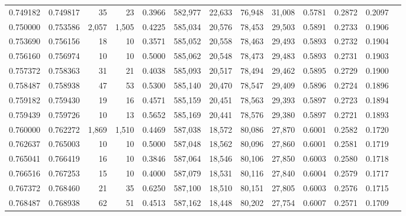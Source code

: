 \begin{tabular}{rrrrrrrrrrrrr}
0.749182 & 0.749817 &     35 &    23 &                                     0.3966 & 582,977 &  22,633 &  76,948 &  31,008 & 0.5781 & 0.2872 & 0.2097 \\
0.750000 & 0.753586 &  2,057 & 1,505 &                                     0.4225 & 585,034 &  20,576 &  78,453 &  29,503 & 0.5891 & 0.2733 & 0.1906 \\
0.753690 & 0.756156 &     18 &    10 &                                     0.3571 & 585,052 &  20,558 &  78,463 &  29,493 & 0.5893 & 0.2732 & 0.1904 \\
0.756160 & 0.756974 &     10 &    10 &                                     0.5000 & 585,062 &  20,548 &  78,473 &  29,483 & 0.5893 & 0.2731 & 0.1903 \\
0.757372 & 0.758363 &     31 &    21 &                                     0.4038 & 585,093 &  20,517 &  78,494 &  29,462 & 0.5895 & 0.2729 & 0.1900 \\
0.758487 & 0.758938 &     47 &    53 &                                     0.5300 & 585,140 &  20,470 &  78,547 &  29,409 & 0.5896 & 0.2724 & 0.1896 \\
0.759182 & 0.759430 &     19 &    16 &                                     0.4571 & 585,159 &  20,451 &  78,563 &  29,393 & 0.5897 & 0.2723 & 0.1894 \\
0.759439 & 0.759726 &     10 &    13 &                                     0.5652 & 585,169 &  20,441 &  78,576 &  29,380 & 0.5897 & 0.2721 & 0.1893 \\
0.760000 & 0.762272 &  1,869 & 1,510 &                                     0.4469 & 587,038 &  18,572 &  80,086 &  27,870 & 0.6001 & 0.2582 & 0.1720 \\
0.762637 & 0.765003 &     10 &    10 &                                     0.5000 & 587,048 &  18,562 &  80,096 &  27,860 & 0.6001 & 0.2581 & 0.1719 \\
0.765041 & 0.766419 &     16 &    10 &                                     0.3846 & 587,064 &  18,546 &  80,106 &  27,850 & 0.6003 & 0.2580 & 0.1718 \\
0.766516 & 0.767253 &     15 &    10 &                                     0.4000 & 587,079 &  18,531 &  80,116 &  27,840 & 0.6004 & 0.2579 & 0.1717 \\
0.767372 & 0.768460 &     21 &    35 &                                     0.6250 & 587,100 &  18,510 &  80,151 &  27,805 & 0.6003 & 0.2576 & 0.1715 \\
0.768487 & 0.768938 &     62 &    51 &                                     0.4513 & 587,162 &  18,448 &  80,202 &  27,754 & 0.6007 & 0.2571 & 0.1709 \\

\end{tabular}
